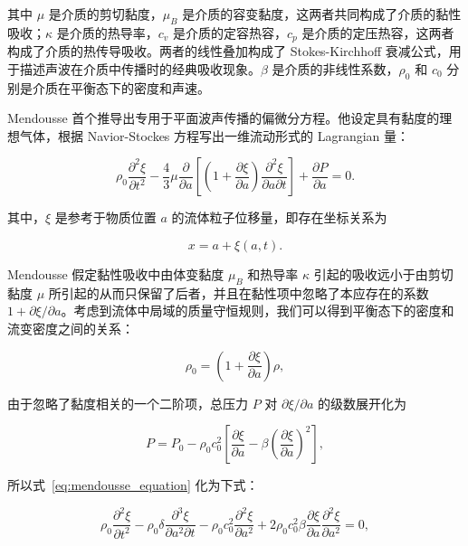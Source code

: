 其中 $\mu$ 是介质的剪切黏度，$\mu_{B}$ 是介质的容变黏度，这两者共同构成了介质的黏性吸收；$\kappa$ 是介质的热导率，$c_{v}$ 是介质的定容热容，$c_{p}$ 是介质的定压热容，这两者构成了介质的热传导吸收。两者的线性叠加构成了 Stokes-Kirchhoff 衰减公式，用于描述声波在介质中传播时的经典吸收现象。$\beta$ 是介质的非线性系数，$\rho_{0}$ 和 $c_{0}$ 分别是介质在平衡态下的密度和声速。

Mendousse 首个推导出专用于平面波声传播的偏微分方程。他设定具有黏度的理想气体，根据 Navior-Stockes 方程写出一维流动形式的 Lagrangian 量\cite{hamilton_nonlinear_1998}：

\begin{equation}
  \rho_{0}\frac{\partial^{2}\xi}{\partial t^{2}} - \frac{4}{3}\mu\frac{\partial }{\partial a}\left[\left(1 + \frac{\partial\xi}{\partial a}\right)\frac{\partial^{2}\xi}{\partial a\partial t}\right] + \frac{\partial P}{\partial a} = 0.\label{eq:mendousse_equation}
\end{equation}

其中，$\xi$ 是参考于物质位置 $a$ 的流体粒子位移量，即存在坐标关系为

\begin{equation}
  x = a + \xi(a,t).
\end{equation}

Mendousse 假定黏性吸收中由体变黏度 $\mu_{B}$ 和热导率 $\kappa$ 引起的吸收远小于由剪切黏度 $\mu$ 所引起的从而只保留了后者，并且在黏性项中忽略了本应存在的系数 $1+\partial\xi/\partial a$。考虑到流体中局域的质量守恒规则，我们可以得到平衡态下的密度和流变密度之间的关系：

\begin{equation}
  \rho_{0} = \left(1 + \frac{\partial\xi}{\partial a}\right)\rho,
\end{equation}

由于忽略了黏度相关的一个二阶项，总压力 $P$ 对 $\partial\xi/\partial a$ 的级数展开化为

\begin{equation}
  P = P_{0} - \rho_{0}c_{0}^{2}\left[\frac{\partial\xi}{\partial a} - \beta\left(\frac{\partial\xi}{\partial a}\right)^{2}\right],
\end{equation}

所以式~\eqref{eq:mendousse_equation} 化为下式：

\begin{equation}
  \rho_{0}\frac{\partial^{2}\xi}{\partial t^{2}} - \rho_{0}\delta\frac{\partial^{3}\xi}{\partial a^{2}\partial t} - \rho_{0}c_{0}^{2}\frac{\partial^{2}\xi}{\partial a^{2}} + 2\rho_{0}c_{0}^{2}\beta\frac{\partial\xi}{\partial a}\frac{\partial^{2}\xi}{\partial a^{2}} = 0,\label{eq:progressive_burgers_equation}
\end{equation}

